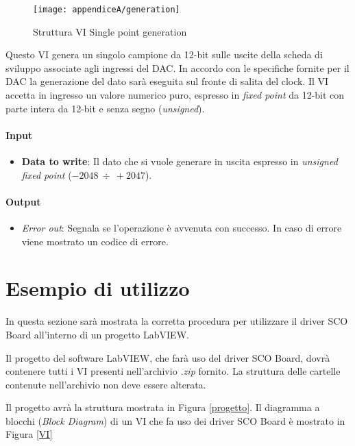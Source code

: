 \begin{figure}[H]  
	\begin{center}
		\texttt{[image: appendiceA/generation]}
		\caption{Struttura VI Single point generation}
	\end{center}
\end{figure}

Questo VI genera un singolo campione da 12-bit sulle uscite della scheda di sviluppo associate agli ingressi del DAC. 
In accordo con le specifiche fornite per il DAC la generazione del dato sarà eseguita sul fronte di salita del clock.
Il VI accetta in ingresso un valore numerico puro, espresso in \textit{fixed point} da 12-bit con parte intera da 12-bit e senza segno (\textit{unsigned}).
\paragraph*{Input}
\begin{itemize}
	\item \textbf{Data to write}: Il dato che si vuole generare in uscita espresso in \textit{unsigned fixed point} ($-2048 \ \div \ +2047$).
\end{itemize}

\paragraph*{Output}
\begin{itemize}
	\item \textit{Error out}: Segnala se l'operazione è avvenuta con successo. In caso di errore viene mostrato un codice di errore.
\end{itemize}

\section*{Esempio di utilizzo}
In questa sezione sarà mostrata la corretta procedura per utilizzare il driver SCO Board all'interno di un progetto LabVIEW.

Il progetto del software LabVIEW, che farà uso del driver SCO Board, dovrà contenere tutti i VI presenti nell'archivio \textit{.zip} fornito. La struttura delle cartelle contenute nell'archivio non deve essere alterata.

Il progetto avrà la struttura mostrata in Figura \ref{progetto}.
Il diagramma a blocchi (\textit{Block Diagram}) di un VI che fa uso dei driver SCO Board è mostrato in Figura \ref{VI}

